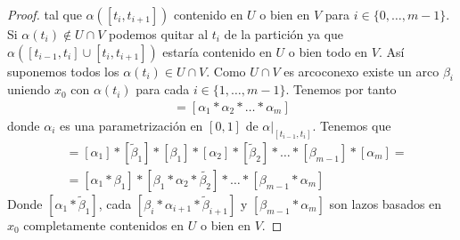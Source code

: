 \begin{lema}
\begin{proof}
        tal que $\alpha([t_i, t_{i+1}])$ contenido en $U$ o bien en $V$ para $i\in\{0,\dots,m-1\}$. Si $\alpha(t_i)\notin U\cap V$ podemos quitar al $t_i$ de la partición ya que $\alpha([t_{i-1}, t_i]\cup [t_i, t_{i+1}])$ estaría contenido en $U$ o bien todo en $V$. Así suponemos todos los $\alpha(t_i)\in U\cap V$. Como $U\cap V$ es arcoconexo existe un arco $\beta_i$ uniendo $x_0$ con $\alpha(t_i)$ para cada $i\in \{1,\dots,m-1\}$. Tenemos por tanto
        \begin{gather*}
            [\alpha] = [\alpha_1\ast\alpha_2\ast\dots\ast\alpha_m]
        \end{gather*}
        donde $\alpha_i$ es una parametrización en $[0,1]$ de $\alpha|_{[t_{i-1}, t_i]}$. Tenemos que
        \begin{align*}
            [\alpha] &= [\alpha_1] \ast [\tilde{\beta}_1] \ast [\beta_1] \ast [\alpha_2]\ast[\tilde{\beta}_2] \ast \dots \ast [\beta_{m-1}] \ast [\alpha_m] =\\
            &= [\alpha_1 \ast \beta_1] \ast [\beta_1\ast \alpha_2 \ast \tilde{\beta_2}] \ast \dots \ast [\beta_{m-1}\ast \alpha_m]
        \end{align*}
        Donde $[\alpha_1\ast \tilde{\beta}_1]$, cada $[\beta_i \ast \alpha_{i+1} \ast \tilde{\beta}_{i+1}]$ y $[\beta_{m-1}\ast \alpha_m]$ son lazos basados en $x_0$ completamente contenidos en $U$ o bien en $V$.
    \end{proof}
\end{lema}

